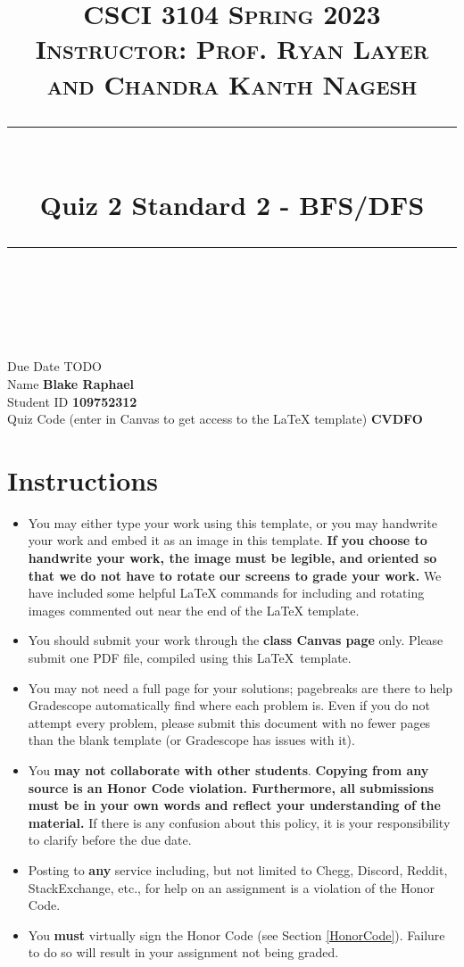 \documentclass[11pt]{article}
\title{
\normalfont \normalsize 
\textsc{CSCI 3104 Spring 2023 \\
Instructor: Prof. Ryan Layer and Chandra Kanth Nagesh} \\
[10pt] 
\rule{\linewidth}{0.5pt} \\[6pt] 
\huge Quiz 2 Standard 2 - BFS/DFS \\
\rule{\linewidth}{2pt}  \\[10pt]
}
\date{}
\theoremstyle{definition}
\theoremstyle{definition}
\theoremstyle{definition}
\begin{document}
\maketitle


\noindent
Due Date \dotfill TODO \\
Name \dotfill \textbf{Blake Raphael} \\
Student ID \dotfill \textbf{109752312} \\
Quiz Code (enter in Canvas to get access to the LaTeX template) \dotfill \textbf{CVDFO}

\tableofcontents

\section*{Instructions}
 \begin{itemize}
	\item You may either type your work using this template, or you may handwrite your work and embed it as an image in this template. \textbf{If you choose to handwrite your work, the image must be legible, and oriented so that we do not have to rotate our screens to grade your work.} We have included some helpful LaTeX commands for including and rotating images commented out near the end of the LaTeX template.
	\item You should submit your work through the \textbf{class Canvas page} only. Please submit one PDF file, compiled using this \LaTeX \ template.
	\item You may not need a full page for your solutions; pagebreaks are there to help Gradescope automatically find where each problem is. Even if you do not attempt every problem, please submit this document with no fewer pages than the blank template (or Gradescope has issues with it).

	\item You \textbf{may not collaborate with other students}. \textbf{Copying from any source is an Honor Code violation. Furthermore, all submissions must be in your own words and reflect your understanding of the material.} If there is any confusion about this policy, it is your responsibility to clarify before the due date. 

	\item Posting to \textbf{any} service including, but not limited to Chegg, Discord, Reddit, StackExchange, etc., for help on an assignment is a violation of the Honor Code.

	\item You \textbf{must} virtually sign the Honor Code (see Section \ref{HonorCode}). Failure to do so will result in your assignment not being graded.
\end{itemize}
\end{document}
